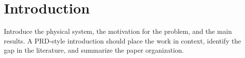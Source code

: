 \section{Introduction}

Introduce the physical system, the motivation for the problem, and the
main results. A PRD-style introduction should place the work in context,
identify the gap in the literature, and summarize the paper organization.
